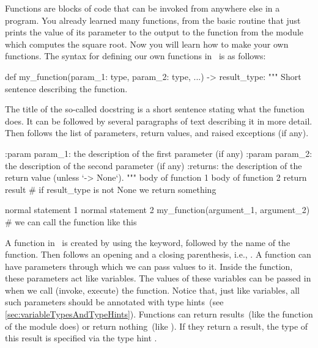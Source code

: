 %
%
Functions are blocks of code that can be invoked from anywhere else in a program.
You already learned many functions, from the basic  routine that just prints the value of its parameter to the output to the  function from the  module which computes the square root.
Now you will learn how to make your own functions.%
%
%
%
%
The syntax for defining our own functions in \python\ is as follows:%
%
\begin{pythonSyntax}
def my_function(param_1: type, param_2: type, ...) -> result_type:
    """
    Short sentence describing the function.

    The title of the so-called docstring is a short sentence stating
    what the function does. It can be followed by several paragraphs of
    text describing it in more detail. Then follows the list of
    parameters, return values, and raised exceptions (if any).

    :param param_1: the description of the first parameter (if any)
    :param param_2: the description of the second parameter (if any)
    :returns: the description of the return value (unless `-> None`).
    """
    body of function 1
    body of function 2
    return result  # if result_type is not None we return something


normal statement 1
normal statement 2
my_function(argument_1, argument_2)  # we can call the function like this
\end{pythonSyntax}
%
A function in \python\ is created by using the  keyword, followed by the name of the function.%
%
%
%
Then follows an opening and a closing parenthesis, i.e., \pythonIdx{(\idxdots)}.
A function can have parameters through which we can pass values to it.
Inside the function, these parameters act like variables.
The values of these variables can be passed in when we call (invoke, execute) the function.
Notice that, just like variables, all such parameters should be annotated with type hints~(see \cref{sec:variableTypesAndTypeHints}).
Functions can return results~(like the  function of the  module does) or return nothing~(like ).
If they return a result, the type of this result is specified via the type hint \pythonIdx{->}.
